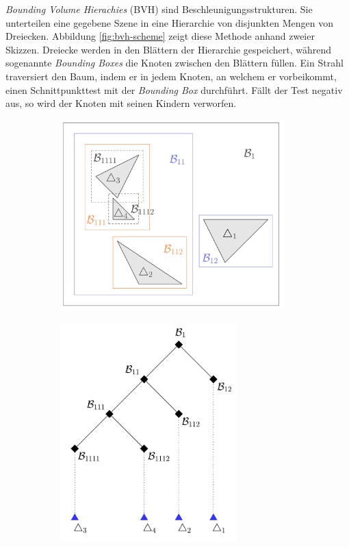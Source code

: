 \documentclass[crop=false]{standalone}
\begin{document}
      \textit{Bounding Volume Hierachies} (BVH) sind Beschleunigungsstrukturen.
      Sie unterteilen eine gegebene Szene in eine Hierarchie von disjunkten Mengen von Dreiecken.
      Abbildung \ref{fig:bvh-scheme} zeigt diese Methode anhand zweier Skizzen.
      Dreiecke werden in den Blättern der Hierarchie gespeichert, während sogenannte \textit{Bounding Boxes} die Knoten zwischen den Blättern füllen.
      Ein Strahl traversiert den Baum, indem er in jedem Knoten, an welchem er vorbeikommt, einen Schnittpunkttest mit der \textit{Bounding Box} durchführt.
      Fällt der Test negativ aus, so wird der Knoten mit seinen Kindern verworfen.
      \begin{figure}[h]
        \center
        \begin{subfigure}[b]{0.49\textwidth}
          \center
          \includegraphics[width=0.95\textwidth]{images/bvh_bounding_boxes.pdf}
        \end{subfigure}
        \begin{subfigure}[b]{0.49\textwidth}
          \center
          \includegraphics[width=0.75\textwidth]{images/bvh_tree.pdf}

\end{subfigure}
\end{figure}
\end{document}
